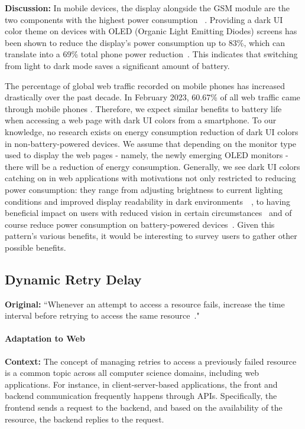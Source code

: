 \textbf{Discussion:} In mobile devices, the display alongside the GSM module are the two components with the highest power consumption ~\cite{Carroll2010}. Providing a dark UI color theme on devices with OLED (Organic Light Emitting Diodes) screens has been shown to reduce the display's power consumption up to 83\%, which can translate into a 69\% total phone power reduction~\cite{Dash2021}. This indicates that switching from light to dark mode saves a significant amount of battery.

The percentage of global web traffic recorded on mobile phones has increased drastically over the past decade. In February 2023, 60.67\% of all web traffic came through mobile phones \cite{statista-website-traffic-from-mobile-devices}. Therefore, we expect similar benefits to battery life when accessing a web page with dark UI colors from a smartphone. To our knowledge, no research exists on energy consumption reduction of dark UI colors in non-battery-powered devices. We assume that depending on the monitor type used to display the web pages - namely, the newly emerging OLED monitors - there will be a reduction of energy consumption. Generally, we see dark UI colors catching on in web applications with motivations not only restricted to reducing power consumption: they range from adjusting brightness to current lighting conditions and improved display readability in dark environments~\cite{Mantiuk2009}~\cite{Rempel2012}, to having beneficial impact on users with reduced vision in certain circumstances~\cite{Bangor1999} and of course reduce power consumption on battery-powered devices~\cite{Dong2009}. Given this pattern's various benefits, it would be interesting to survey users to gather other possible benefits.

\subsection{Dynamic Retry Delay}\label{sec:patterns-DynamicRetryDelay}
\textbf{Original:} ``Whenever an attempt to access a resource fails, increase the time interval before retrying to access the same resource~\cite{cruz2019catalog}."

\paragraph{Adaptation to Web}\mbox{}

\textbf{Context:} The concept of managing retries to access a previously failed resource is a common topic across all computer science domains, including web applications. For instance, in client-server-based applications, the front and backend communication frequently happens through APIs. Specifically, the frontend sends a request to the backend, and based on the availability of the resource, the backend replies to the request.

